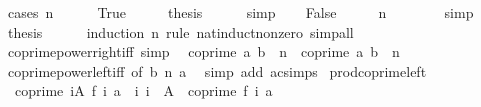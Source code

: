 \begin{isabellebody}
\ {\isacharparenleft}{\kern0pt}cases\ {\isachardoublequoteopen}n\ {\isacharequal}{\kern0pt}\ {}{\isachardoublequoteclose}{\isacharparenright}{\kern0pt}\isanewline
\ \ \isamarkupfalse%
\ True\isanewline
\ \ \isamarkupfalse%
\ \isamarkupfalse%
\ {\isacharquery}{\kern0pt}thesis\isanewline
\ \ \ \ \isamarkupfalse%
\ simp\isanewline
{}\isamarkupfalse%
\isanewline
\ \ \isamarkupfalse%
\ False\isanewline
\ \ \isamarkupfalse%
\ \isamarkupfalse%
\ {\isachardoublequoteopen}n\ {\isachargreater}{\kern0pt}\ {}{\isachardoublequoteclose}\isanewline
\ \ \ \ \isamarkupfalse%
\ simp\isanewline
\ \ \isamarkupfalse%
\ \isamarkupfalse%
\ {\isacharquery}{\kern0pt}thesis\isanewline
\ \ \ \ \isamarkupfalse%
\ {\isacharparenleft}{\kern0pt}induction\ n\ rule{\isacharcolon}{\kern0pt}\ nat{\isacharunderscore}{\kern0pt}induct{\isacharunderscore}{\kern0pt}non{\isacharunderscore}{\kern0pt}zero{\isacharparenright}{\kern0pt}\ simp{\isacharunderscore}{\kern0pt}all\isanewline
{}\isamarkupfalse%
%
\endisatagproof
{\isafoldproof}%
%
\isadelimproof
\isanewline
%
\endisadelimproof
\isanewline
{}\isamarkupfalse%
\ coprime{\isacharunderscore}{\kern0pt}power{\isacharunderscore}{\kern0pt}right{\isacharunderscore}{\kern0pt}iff\ {\isacharbrackleft}{\kern0pt}simp{\isacharbrackright}{\kern0pt}{\isacharcolon}{\kern0pt}\isanewline
\ \ {\isachardoublequoteopen}coprime\ a\ {\isacharparenleft}{\kern0pt}b\ {\isacharcircum}{\kern0pt}\ n{\isacharparenright}{\kern0pt}\ {\isasymlongleftrightarrow}\ coprime\ a\ b\ {\isasymor}\ n\ {\isacharequal}{\kern0pt}\ {}{\isachardoublequoteclose}\isanewline
%
\isadelimproof
\ \ %
\endisadelimproof
%
\isatagproof
{}\isamarkupfalse%
\ coprime{\isacharunderscore}{\kern0pt}power{\isacharunderscore}{\kern0pt}left{\isacharunderscore}{\kern0pt}iff\ {\isacharbrackleft}{\kern0pt}of\ b\ n\ a{\isacharbrackright}{\kern0pt}\ \isamarkupfalse%
\ {\isacharparenleft}{\kern0pt}simp\ add{\isacharcolon}{\kern0pt}\ ac{\isacharunderscore}{\kern0pt}simps{\isacharparenright}{\kern0pt}%
\endisatagproof
{\isafoldproof}%
%
\isadelimproof
\isanewline
%
\endisadelimproof
\isanewline
{}\isamarkupfalse%
\ prod{\isacharunderscore}{\kern0pt}coprime{\isacharunderscore}{\kern0pt}left{\isacharcolon}{\kern0pt}\isanewline
\ \ {\isachardoublequoteopen}coprime\ {\isacharparenleft}{\kern0pt}{\isasymProd}i{\isasymin}A{\isachardot}{\kern0pt}\ f\ i{\isacharparenright}{\kern0pt}\ a{\isachardoublequoteclose}\ \ {\isachardoublequoteopen}{\isasymAnd}i{\isachardot}{\kern0pt}\ i\ {\isasymin}\ A\ {\isasymLongrightarrow}\ coprime\ {\isacharparenleft}{\kern0pt}f\ i{\isacharparenright}{\kern0pt}\ a{\isachardoublequoteclose}\isanewline

\end{isabellebody}

